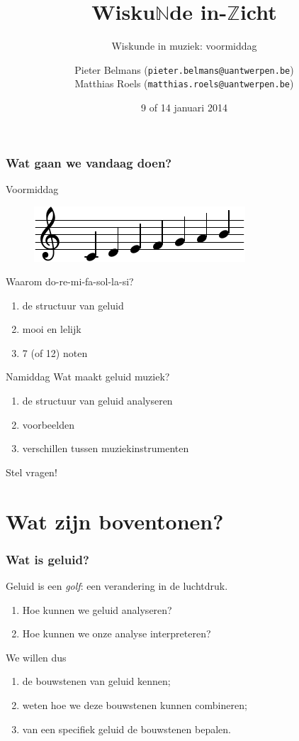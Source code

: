 \documentclass[compress, darktitle, framenumber, handout, totalframenumber]{beamer}
\title{Wisku$\mathbb{N}$de in-$\mathbb{Z}$icht}
\subtitle{Wiskunde in muziek: voormiddag}
\author{Pieter Belmans (\texttt{pieter.belmans@uantwerpen.be}) \\ Matthias Roels (\texttt{matthias.roels@uantwerpen.be})}
\date{9 of 14 januari 2014}
\begin{document}
\begin{frame}
  \titlepage
\end{frame}

\begin{frame}
  \frametitle{Wat gaan we vandaag doen?}

  \begin{block}{Voormiddag}
    \begin{figure}
      \centering
      \includegraphics{scores/scale-cropped}
    \end{figure}
    Waarom do-re-mi-fa-sol-la-si?
    \begin{enumerate}
      \item de structuur van geluid
      \item mooi en lelijk
      \item 7 (of 12) noten
    \end{enumerate}
  \end{block}

  \pause

  \begin{block}{Namiddag}
    Wat maakt geluid muziek?
    \begin{enumerate}
      \item de structuur van geluid analyseren
      \item voorbeelden
      \item verschillen tussen muziekinstrumenten
    \end{enumerate}
  \end{block}

  Stel vragen!
\end{frame}


\section{Wat zijn boventonen?}

\begin{frame}
  \frametitle{Wat is geluid?}

  Geluid is een \emph{golf}: een verandering in de luchtdruk.
  \pause
  \begin{enumerate}
    \item Hoe kunnen we geluid analyseren?
    \item Hoe kunnen we onze analyse interpreteren?
  \end{enumerate}
  \pause
  We willen dus
  \begin{enumerate}
    \item de bouwstenen van geluid kennen;
    \item weten hoe we deze bouwstenen kunnen combineren;
    \item van een specifiek geluid de bouwstenen bepalen.
  \end{enumerate}
\end{frame}
\end{document}
